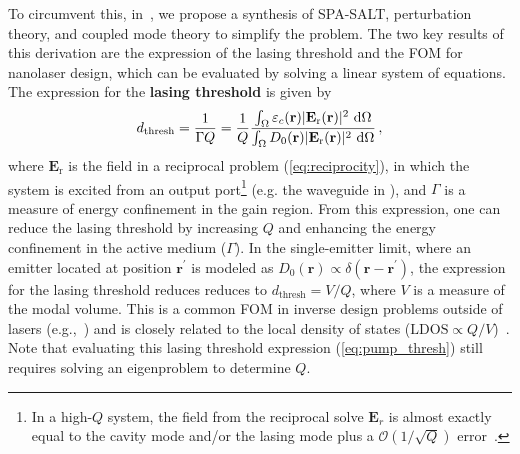 To circumvent this, in~\cite{ownpub4}, we propose a synthesis of SPA-SALT, perturbation theory, and coupled mode theory to simplify the problem. 
The two key results of this derivation are the expression of the lasing threshold and the FOM for nanolaser design, which can be evaluated by solving a linear system of equations.
The expression for the \textbf{lasing threshold} is given by~\cite{ownpub4}
\begin{equation}\label{eq:pump_thresh}
 d_\text{thresh} = \frac{1}{\Gamma Q} = \frac{1}{Q} \frac{\int_{\Omega} \varepsilon_c(\mathbf{r})|\mathbf{E}_{\text{r}}(\mathbf{r})|^2\, \mathop{}\!\text{d} \Omega}{\int_{\Omega} D_0(\mathbf{r}) |\mathbf{E}_{\text{r}}(\mathbf{r})|^2\, \mathop{}\!\text{d} \Omega}\,,
\end{equation}
where $\mathbf{E}_\text{r}$ is the field in a reciprocal problem (\eqref{eq:reciprocity}), in which the system is excited from an output port\footnote{In a high-$Q$ system, the field from the reciprocal solve $\mathbf{E}_r$ is almost exactly equal to the cavity mode and/or the lasing mode plus a $\mathcal{O}(1/\sqrt{Q})$ error~\cite{phot_crys}.} (e.g. the waveguide in ), and $\Gamma$ is a measure 
of energy confinement in the gain region. From this expression, one can reduce the lasing threshold by increasing $Q$ and enhancing the energy confinement in the
active medium ($\Gamma$). In the single-emitter limit, where an emitter located at position \(\mathbf{r}^\prime\) is modeled as 
\(D_0(\mathbf{r}) \propto \delta(\mathbf{r} - \mathbf{r}^\prime)\), 
the expression for the lasing threshold reduces  reduces to \(d_{\text{thresh}} = V / Q\), where $V$ is a measure of the modal volume. This is a common FOM in inverse design problems outside of lasers (e.g.,~\cite{LDOS_opt_wang}) and is closely
related to the local density of states ($ \text{LDOS} \propto Q/V$)~\cite{LDOS_opt_wang}.
   Note that evaluating this lasing threshold expression (\eqref{eq:pump_thresh}) still requires solving an eigenproblem to determine \(Q\).


